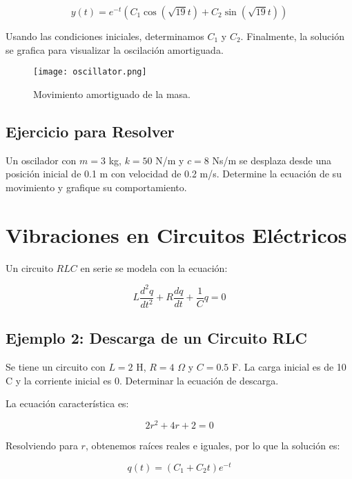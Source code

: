 \begin{equation}
y(t) = e^{-t} \left( C_1 \cos (\sqrt{19}t) + C_2 \sin (\sqrt{19}t) \right)
\end{equation}

Usando las condiciones iniciales, determinamos \( C_1 \) y \( C_2 \). Finalmente, la solución se grafica para visualizar la oscilación amortiguada.

\begin{figure}[H]
    \centering
    \texttt{[image: oscillator.png]}
    \caption{Movimiento amortiguado de la masa.}
\end{figure}

\subsection*{Ejercicio para Resolver}
Un oscilador con \( m = 3 \) kg, \( k = 50 \) N/m y \( c = 8 \) Ns/m se desplaza desde una posición inicial de 0.1 m con velocidad de 0.2 m/s. Determine la ecuación de su movimiento y grafique su comportamiento.

\section{Vibraciones en Circuitos Eléctricos}
Un circuito \( RLC \) en serie se modela con la ecuación:

\begin{equation}
L \frac{d^2q}{dt^2} + R \frac{dq}{dt} + \frac{1}{C} q = 0
\end{equation}

\subsection*{Ejemplo 2: Descarga de un Circuito RLC}
Se tiene un circuito con \( L = 2 \) H, \( R = 4 \) \( \Omega \) y \( C = 0.5 \) F. La carga inicial es de 10 C y la corriente inicial es 0. Determinar la ecuación de descarga.

La ecuación característica es:

\begin{equation}
2r^2 + 4r + 2 = 0
\end{equation}

Resolviendo para \( r \), obtenemos raíces reales e iguales, por lo que la solución es:

\begin{equation}
q(t) = (C_1 + C_2 t) e^{-t}
\end{equation}

